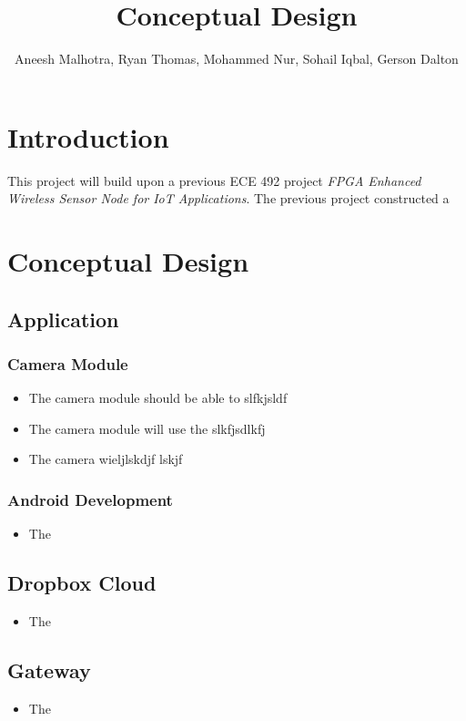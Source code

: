 \documentclass[11pt]{article}
\title{Conceptual Design}
\author{Aneesh Malhotra, Ryan Thomas, Mohammed Nur, Sohail Iqbal, Gerson Dalton}
\begin{document}
\maketitle

\section{Introduction}
This project will build upon a previous ECE 492 project \textit{FPGA Enhanced Wireless Sensor Node for IoT Applications}. The previous project constructed a 
\section{Conceptual Design}

\subsection{Application} 

\subsubsection{Camera Module}

\begin{itemize}
\item The camera module should be able to slfkjsldf
\item The camera module will use the slkfjsdlkfj
\item The camera wieljlskdjf lskjf 
\end{itemize}

\subsubsection{Android Development}

\begin{itemize}
\item The 
\end{itemize}

\subsection{Dropbox Cloud}
\begin{itemize}
\item The 
\end{itemize}

\subsection{Gateway}
\begin{itemize}
\item The 
\end{itemize}
\end{document}
